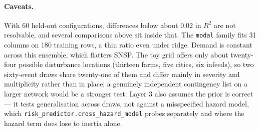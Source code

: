 \documentclass[11pt,a4paper]{article}
\newcommand{\Rtwo}{\ensuremath{R^{2}}}
\begin{document}
\paragraph{Caveats.} With 60 held-out configurations, differences below
about $0.02$ in \Rtwo{} are not resolvable, and several comparisons above
sit inside that. The \texttt{modal} family fits 31 columns on 180 training
rows, a thin ratio even under ridge. Demand is constant across this
ensemble, which flatters SNSP. The toy grid offers only about
twenty-four possible disturbance locations (thirteen farms, five cities, six
infeeds), so two sixty-event draws share twenty-one of them and differ mainly
in severity and multiplicity rather than in place; a genuinely independent
contingency list on a larger network would be a stronger test. Layer 3 also
assumes the prior is correct --- it tests generalisation across draws, not
against a misspecified hazard model, which
\texttt{risk\_predictor.cross\_hazard\_model} probes separately and where the
hazard term does lose to inertia alone.
\end{document}
